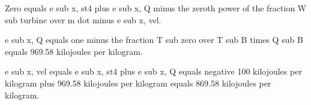 Zero equals e sub x, st4 plus e sub x, Q minus the zeroth power of the fraction W sub turbine over m dot minus e sub x, vel.

e sub x, Q equals one minus the fraction T sub zero over T sub B times Q sub B equals 969.58 kilojoules per kilogram.

e sub x, vel equals e sub x, st4 plus e sub x, Q equals negative 100 kilojoules per kilogram plus 969.58 kilojoules per kilogram equals 869.58 kilojoules per kilogram.